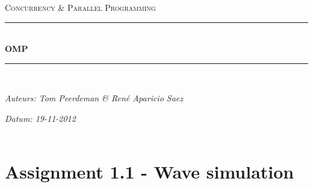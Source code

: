 \documentclass[a4paper]{article}
\newcommand{\HRule}{\rule{\linewidth}{0.5mm}}
\begin{document}
	\begin{titlepage}
	\begin{center}
		\textsc{\Large Concurrency \& Parallel Programming}\\[0.5cm]
		\HRule \\[0,4cm]
		\textsc{\huge \bfseries OMP}
		\HRule \\[8cm]
		\begin{minipage}{0.4\textwidth}
			\begin{flushleft}\large
				\emph{Auteurs: Tom Peerdeman \& Ren\'e Aparicio Saez}\\
			\end{flushleft}
		\end{minipage}
		\begin{minipage}{0.4\textwidth}
			\begin{flushright}\large
			\emph{Datum: 19-11-2012\\\hspace{1cm}}\\
			\end{flushright}
		\end{minipage}
	\end{center}
	\end{titlepage}

  \section{Assignment 1.1 - Wave simulation}
\end{document}
